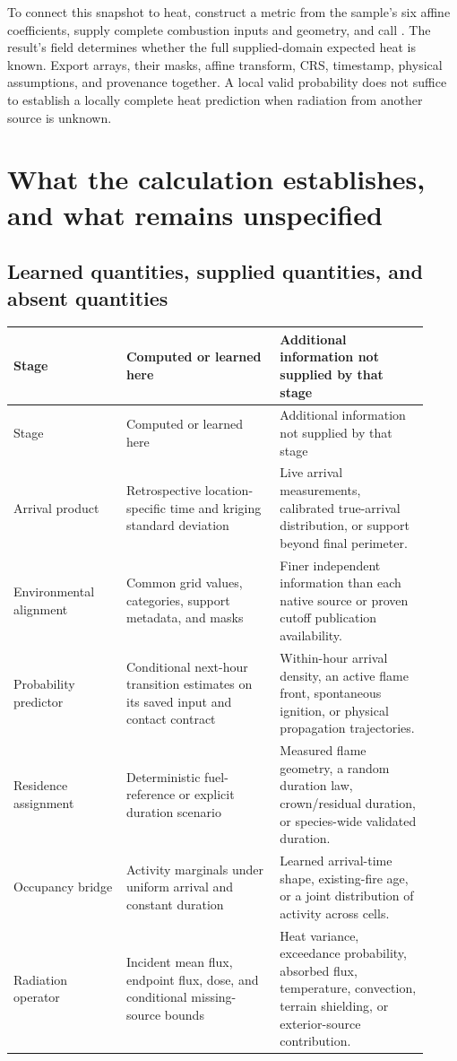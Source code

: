 \documentclass[11pt,a4paper]{article}
\begin{document}
To connect this snapshot to heat, construct a metric  from
the sample's six affine coefficients, supply complete combustion inputs and
geometry, and call .
The result's  field determines whether the full supplied-domain
expected heat is known. Export arrays, their masks, affine transform, CRS,
timestamp, physical assumptions, and provenance together. A local valid
probability does not suffice to establish a locally complete heat prediction
when radiation from another source is unknown.

\section{What the calculation establishes, and what remains unspecified}
\label{sec:limits}
\subsection{Learned quantities, supplied quantities, and absent quantities}
\begin{longtable}{@{}P{0.25\linewidth}P{0.34\linewidth}P{0.33\linewidth}@{}}
\toprule Stage & Computed or learned here & Additional information not supplied by that stage\\\midrule
\endfirsthead
\toprule Stage & Computed or learned here & Additional information not supplied by that stage\\\midrule
\endhead
Arrival product & Retrospective location-specific time and kriging standard deviation & Live arrival measurements, calibrated true-arrival distribution, or support beyond final perimeter.\\
Environmental alignment & Common grid values, categories, support metadata, and masks & Finer independent information than each native source or proven cutoff publication availability.\\
Probability predictor & Conditional next-hour transition estimates on its saved input and contact contract & Within-hour arrival density, an active flame front, spontaneous ignition, or physical propagation trajectories.\\
Residence assignment & Deterministic fuel-reference or explicit duration scenario & Measured flame geometry, a random duration law, crown/residual duration, or species-wide validated duration.\\
Occupancy bridge & Activity marginals under uniform arrival and constant duration & Learned arrival-time shape, existing-fire age, or a joint distribution of activity across cells.\\
Radiation operator & Incident mean flux, endpoint flux, dose, and conditional missing-source bounds & Heat variance, exceedance probability, absorbed flux, temperature, convection, terrain shielding, or exterior-source contribution.\\
\bottomrule
\end{longtable}
\end{document}
